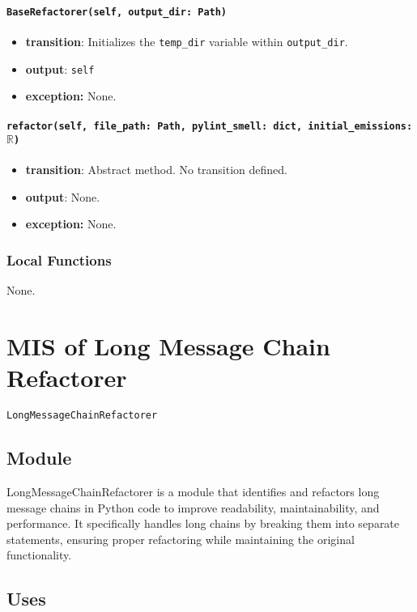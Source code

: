 \documentclass[12pt, titlepage]{article}
\begin{document}
\paragraph{\texttt{BaseRefactorer(self, output\_dir: Path)}}
\begin{itemize}
  \item \textbf{transition}: Initializes the \texttt{temp\_dir} variable within \texttt{output\_dir}.
  \item \textbf{output}: \texttt{self}
  \item \textbf{exception:} None.
\end{itemize}

\paragraph{\texttt{refactor(self, file\_path: Path, pylint\_smell: dict, initial\_emissions: $\mathbb{R}$)}}
\begin{itemize}
  \item \textbf{transition}: Abstract method. No transition defined.
  \item \textbf{output}: None.
  \item \textbf{exception:} None.
\end{itemize}

\subsubsection{Local Functions}
None.

\newpage


\section{MIS of Long Message Chain Refactorer} \label{mis:LMC}

\texttt{LongMessageChainRefactorer}

\subsection{Module}

LongMessageChainRefactorer is a module that identifies and refactors long message chains in Python code to improve readability, maintainability, and performance. It specifically handles long chains by breaking them into separate statements, ensuring proper refactoring while maintaining the original functionality.

\subsection{Uses}
\end{document}

